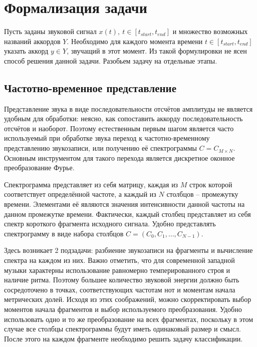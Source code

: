\section{Формализация задачи} \label{sectT_task}

Пусть заданы звуковой сигнал $x(t),~t \in [t_{start}, t_{end}]$ и множество
возможных названий аккордов $Y$. Необходимо для каждого момента времени $t \in
[t_{start}, t_{end}]$ указать аккорд $y \in Y$, звучащий в этот момент. Из такой
формулировки не ясен способ решения данной задачи. Разобьем задачу на отдельные
этапы.

\subsection{Частотно-временное представление}

Представление звука в виде последовательности отсчётов амплитуды не является
удобным для обработки: неясно, как сопоставить аккорду последовательность
отсчётов и наоборот. Поэтому естественным первым шагом является часто
используемый при обработке звука переход к частотно-временному представлению
звукозаписи, или получению её спектрограммы $C = C_{M \times N}$. Основным
инструментом для такого перехода является дискретное оконное преобразование
Фурье.

Спектрограмма представляет из себя матрицу, каждая из $M$ строк которой
соответствует определённой частоте, а каждый из $N$ столбцов -- промежутку
времени. Элементами её являются значения интенсивности данной частоты на данном
промежутке времени. Фактически, каждый столбец представляет из себя спектр
короткого фрагмента исходного сигнала. Удобно представлять спектрограмму в виде
набора столбцов $C = (C_0, C_1, \ldots, C_{N-1})$.

Здесь возникает 2 подзадачи: разбиение звукозаписи на фрагменты и вычисление
спектра на каждом из них. Важно отметить, что для современной западной музыки
характерны использование равномерно темперированного строя и наличие ритма.
Поэтому большее количество звуковой энергии должно быть сосредоточено в точках,
соответствующих частотам нот и моментам начала метрических долей. Исходя из этих
соображений, можно скорректировать выбор моментов начала фрагментов и выбор
используемого преобразования. Удобно использовать одно и то же преобразование на
всех фрагментах, поскольку в этом случае все столбцы спектрограммы будут иметь
одинаковый размер и смысл. После этого на каждом фрагменте необходимо решить
задачу классификации.

